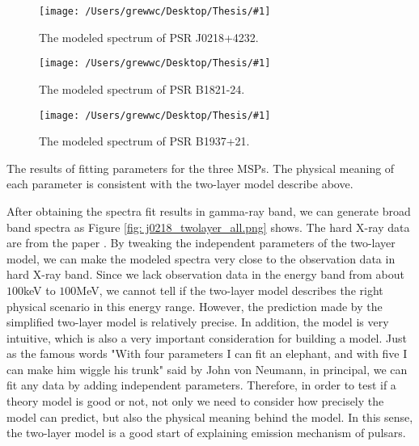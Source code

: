 \documentclass[12pt]{report}
\newcommand{\mycaption}[1]{\protect \caption{#1}}
\newcommand{\singleFig}[3]{
  \begin{figure}[!ht]
    \centering
    \texttt{[image: /Users/grewwc/Desktop/Thesis/\#1]}
    \caption{#3}
    \label{fig: #1}
  \end{figure}
}
\newcommand{\change}[1]{
  $<$\colorbox{red}{\textbf{change}}$>$#1$<$\colorbox{red}{\textbf{/change}}$>$
}
\newcommand{\mayChange}[1]{
  $<$\colorbox{red}{\textbf{mayChange}}$>$#1$<$\colorbox{red}{\textbf{/mayChange}}$>$
}
\begin{document}
        \singleFig{j0218_twolayer_cur.png}{0.41}{The modeled spectrum of PSR J0218+4232.}
        \singleFig{b1821_twolayer_cur.png}{0.4}{The modeled spectrum of PSR B1821-24.}
        \singleFig{j1939_twolayer_cur.png}{0.41}{The modeled spectrum of PSR B1937+21.}
        
        \begin{table}[!ht]
          \centering
          \mycaption{The results of fitting parameters for the three MSPs. The physical 
            meaning of each parameter is consistent with the two-layer model describe above.}
          \label{table: twolayer_fit_parameter}
        \end{table}
        \vspace{0.5cm}
          
        After obtaining the spectra fit results in gamma-ray band, we can generate broad band spectra 
        as Figure \ref{fig: j0218_twolayer_all.png} shows. 
        The hard X-ray data are from the paper \cite{0004-637X-845-2-159}. By tweaking the 
        independent parameters of the two-layer model, we can make the modeled spectra very 
        close to the observation data in hard X-ray band. Since we lack observation data in 
        the energy band from about $100$keV to $100$MeV, we cannot tell if the two-layer model 
        describes the right physical scenario in this energy range. However, the prediction made 
        by the simplified two-layer model is relatively precise. In addition, the model is very 
        intuitive, which is also a very important consideration for building a model. Just as 
        the famous words "With four parameters I can fit an elephant, and with five I 
        can make him wiggle his trunk" 
        said by John von Neumann, in principal, we can fit any data by adding independent parameters. 
        Therefore, in order to test if a theory model is good or not, not only we need to consider 
        how precisely the model can predict, but also the physical meaning behind the model. In this 
        sense, the two-layer model is a good start of explaining emission mechanism of 
        pulsars. 
          
\end{document}
